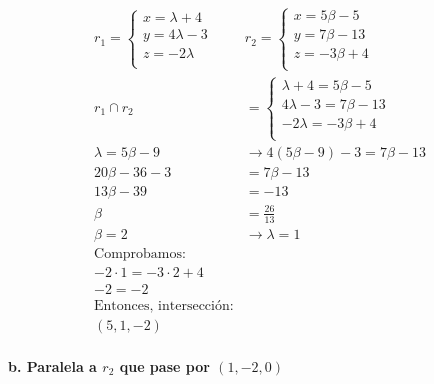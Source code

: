 \documentclass{article}
\begin{document}
\begin{align*}
    r_1 =
    \begin{cases}
        x = \lambda + 4  \\
        y = 4 \lambda -3 \\
        z = -2 \lambda   \\
    \end{cases}   &
    r_2 =
    \begin{cases}
        x = 5 \beta - 5  \\
        y = 7 \beta - 13 \\
        z = -3 \beta + 4 \\
    \end{cases}                                                       \\
    r_1 \cap r_2          & =
    \begin{cases}
        \lambda + 4 = 5 \beta - 5   \\
        4 \lambda -3 = 7 \beta - 13 \\
        -2 \lambda = -3 \beta + 4   \\
    \end{cases}                                            \\
    \lambda = 5 \beta - 9 & \rightarrow 4 (5 \beta - 9) - 3 = 7 \beta - 13 \\
    20 \beta - 36 - 3     & = 7 \beta - 13                                 \\
    13 \beta - 39         & = - 13                                         \\
    \beta                 & = \frac{26}{13}                                \\
    \boxed{\beta = 2}     & \rightarrow \boxed{\lambda = 1}                \\
    \text{Comprobamos:}                                                    \\
    -2 \cdot 1 = -3 \cdot 2 + 4                                            \\
    \boxed{-2 = -2}                                                        \\
    \text{Entonces, intersección:}                                         \\
    \boxed{(5, 1, -2)}                                                     \\
\end{align*}

\textbf{b. Paralela a \(r_2\) que pase por \((1,-2,0)\)}
\end{document}
